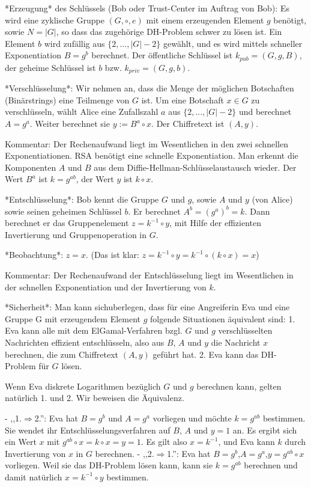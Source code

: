 \documentclass[a4paper]{article}
\begin{document}
\begin{multicols}{3}
        *Erzeugung* des Schlüssels (Bob oder Trust-Center im Auftrag von Bob): Es wird eine zyklische Gruppe $(G,\circ,e)$ mit einem erzeugenden Element $g$ benötigt, sowie $N=|G|$, so dass das zugehörige DH-Problem schwer zu lösen ist. Ein Element $b$ wird zufällig aus $\{2 ,...,|G|-2\}$ gewählt, und es wird mittels schneller Exponentiation $B=g^b$ berechnet. Der öffentliche Schlüssel ist $k_{pub}= (G,g,B)$, der geheime Schlüssel ist $b$ bzw. $k_{priv}=(G,g,b)$.

        *Verschlüsselung*: Wir nehmen an, dass die Menge der möglichen Botschaften (Binärstrings) eine Teilmenge von $G$ ist. Um eine Botschaft $x\in G$ zu verschlüsseln, wählt Alice eine Zufallszahl $a$ aus $\{2,...,|G|-2\}$ und berechnet $A=g^a$. Weiter berechnet sie $y:=B^a \circ x$. Der Chiffretext ist $(A,y)$.

        Kommentar: Der Rechenaufwand liegt im Wesentlichen in den zwei schnellen Exponentiationen. RSA benötigt eine schnelle Exponentiation. Man erkennt die Komponenten $A$ und $B$ aus dem Diffie-Hellman-Schlüsselaustausch wieder. Der Wert $B^a$ ist $k=g^{ab}$, der Wert $y$ ist $k\circ x$.

        *Entschlüsselung*: Bob kennt die Gruppe $G$ und $g$, sowie $A$ und $y$ (von Alice) sowie seinen geheimen Schlüssel $b$. Er berechnet $A^b= (g^a)^b=k$. Dann berechnet er das Gruppenelement $z=k^{-1}\circ y$, mit Hilfe der effizienten Invertierung und Gruppenoperation in $G$.

        *Beobachtung*: $z=x$. (Das ist klar: $z=k^{-1}\circ y=k^{-1}\circ(k\circ x) =x$)

        Kommentar: Der Rechenaufwand der Entschlüsselung liegt im Wesentlichen in der schnellen Exponentiation und der Invertierung von $k$.

        *Sicherheit*: Man kann sichuberlegen, dass für eine Angreiferin Eva und eine Gruppe G mit erzeugendem Element $g$ folgende Situationen äquivalent sind:
        1. Eva kann alle mit dem ElGamal-Verfahren bzgl. $G$ und $g$ verschlüsselten Nachrichten effizient entschlüsseln, also aus $B$, $A$ und $y$ die Nachricht $x$ berechnen, die zum Chiffretext $(A,y)$ geführt hat.
        2. Eva kann das DH-Problem für $G$ lösen.

        Wenn Eva diskrete Logarithmen bezüglich $G$ und $g$ berechnen kann, gelten natürlich 1. und 2. Wir beweisen die Äquivalenz.

        - ,,1.$\Rightarrow$2.'': Eva hat $B=g^b$ und $A=g^a$ vorliegen und möchte $k=g^{ab}$ bestimmen. Sie wendet ihr Entschlüsselungsverfahren auf $B$, $A$ und $y=1$ an. Es ergibt sich ein Wert $x$ mit $g^{ab}\circ x=k\circ x=y=1$. Es gilt also $x=k^{-1}$, und Eva kann $k$ durch Invertierung von $x$ in $G$ berechnen.
        - ,,2.$\Rightarrow$1.'': Eva hat $B=g^b$,$A=g^a$,$y=g^{ab}\circ x$ vorliegen. Weil sie das DH-Problem lösen kann, kann sie $k=g^{ab}$ berechnen und damit natürlich $x=k^{-1}\circ y$ bestimmen.


\end{multicols}
\end{document}
